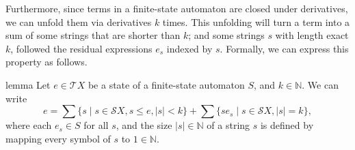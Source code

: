\documentclass[a4paper,UKenglish,cleveref, autoref, thm-restate]{lipics-v2021}
\begin{document}
Furthermore, since terms in a finite-state automaton are closed under
derivatives, we can unfold them via derivatives \(k\) times.  This unfolding
will turn a term into a sum of some strings that are shorter than \(k\); and
some strings \(s\) with length exact \(k\), followed the residual expressions
\(e_{s}\) indexed by \(s\).  Formally, we can express this property as follows.

\begin{theoremEnd}{lemma}
  \label{lem:expansion}
  Let $e  \in  \mathcal{T}X$ be a state of a finite-state automaton $S$, and
  $k  \in  \mathbb{N}$.  We can write
  \[ e =  \sum \{s \mid s  \in  \mathcal{S}X, s  \leq  e, |s| < k\} + %
     \sum \{se_s \mid s  \in  \mathcal{S}X, |s| = k\}, \] where each $e_s  \in  S$ for
  all $s$, and the size $|s|  \in  \mathbb{N}$ of a string $s$ is defined by mapping every
  symbol of $s$ to $1  \in  \mathbb{N}$.
\end{theoremEnd}
\end{document}
